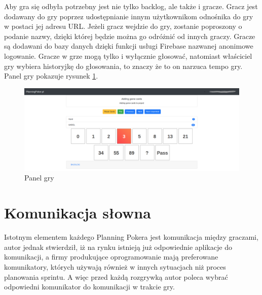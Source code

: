 Aby gra się odbyła potrzebny jest nie tylko backlog, ale także i gracze.
Gracz jest dodawany do gry poprzez udostępnianie innym użytkownikom odnośnika do gry
w postaci jej adresu URL.
Jeżeli gracz wejdzie do gry, zostanie poproszony o podanie nazwy,
dzięki której będzie można go odróżnić od innych graczy.
Gracze są dodawani do bazy danych dzięki funkcji usługi Firebase nazwanej anonimowe logowanie.
Gracze w grze mogą tylko i wyłącznie głosować,
natomiast właściciel gry wybiera historyjkę do głosowania, to znaczy że to on narzuca tempo gry.
Panel gry pokazuje rysunek \ref{rys:gra}.
\begin{figure}
	\centering\includegraphics[width=.7\textwidth]{img/gra}
	\caption{Panel gry}\label{rys:gra}%
\end{figure}

\section{Komunikacja słowna}

Istotnym elementem każdego Planning Pokera jest komunikacja między graczami,
autor jednak stwierdził,
iż na rynku istnieją już odpowiednie aplikacje do komunikacji,
a firmy produkujące oprogramowanie mają preferowane komunikatory, których używają
również w innych sytuacjach niż proces planowania sprintu.
A więc przed każdą rozgrywką autor poleca wybrać odpowiedni komunikator do komunikacji w trakcie gry.
